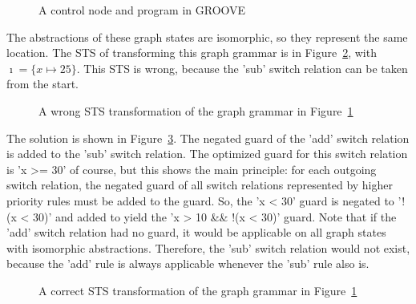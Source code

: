\begin{figure}[ht]
  \begin{center}
  \end{center}
  \caption{A control node and program in GROOVE}
  \label{fig:priority_gg}
\end{figure} 

The abstractions of these graph states are isomorphic, so they represent the same location. The STS of transforming this graph grammar is in Figure~\ref{fig:priority_sts_wrong}, with $\imath = \{x \mapsto 25\}$. This STS is wrong, because the 'sub' switch relation can be taken from the start.

\begin{figure}[ht]
  \begin{center}
    
  \end{center}
  \caption{A wrong STS transformation of the graph grammar in Figure~\ref{fig:priority_gg}}
  \label{fig:priority_sts_wrong}
\end{figure}

The solution is shown in Figure~\ref{fig:priority_sts_right}. The negated guard of the 'add' switch relation is added to the 'sub' switch relation. The optimized guard for this switch relation is 'x >= 30' of course, but this shows the main principle: for each outgoing switch relation, the negated guard of all switch relations represented by higher priority rules must be added to the guard. So, the 'x < 30' guard is negated to '!(x < 30)' and added to yield the 'x > 10 \&\& !(x < 30)' guard. Note that if the 'add' switch relation had no guard, it would be applicable on all graph states with isomorphic abstractions. Therefore, the 'sub' switch relation would not exist, because the 'add' rule is always applicable whenever the 'sub' rule also is.

\begin{figure}[ht]
  \begin{center}
    
  \end{center}
  \caption{A correct STS transformation of the graph grammar in Figure~\ref{fig:priority_gg}}
  \label{fig:priority_sts_right}
\end{figure}
